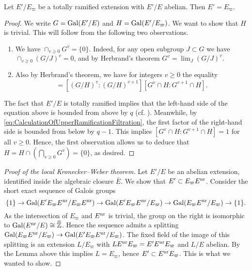 \documentclass[../main.tex]{subfiles}
\begin{document}
\begin{lem}\label{lem:LocalKronWebAlmostDone}
  Let $E'/E_\varpi$ be a totally ramified extension with $E'/E$ abelian.
  Then $E' = E_\varpi$. 
\begin{proof}
  We write $G = \operatorname{Gal}(E'/E)$ and $H = \operatorname{Gal}(E'/E_\varpi)$. We want to show that 
  $H$ is trivial. This will follow from the following two observations.
  \begin{enumerate}
    \item We have $\cap_{v \geq 0} G^v = \{0\}$. Indeed, for any open subgroup
      $J \subset G$ we have $\cap_{v \geq 0} (G/J)^v = 0$, and by Herbrand's theorem
      $G^v = \lim_J (G/J)^v$. 
    \item Also by Herbrand's theorem, we have for integers $v \geq 0$ the equality
      \begin{equation*}
        [G^v : G^{v+1}] = [(G/H)^v : (G/H)^{v+1}] [G^v \cap H : G^{v+1} \cap H].
      \end{equation*}
  \end{enumerate}
  The fact that $E'/E$ is totally ramified implies that the left-hand side of
  the equation above is bounded from above by $q$ (cf. \cite[Lemma 3]{gold1981local}).
  Meanwhile, by \eqref{eq:CalculationOfUpperRamificationFiltration}, the first factor
  of the right-hand side is bounded from below by $q-1$. This implies $[G^v \cap H :
  G^{v+1} \cap H] = 1$ for all $v \geq 0$. Hence, the first observation allows us
  to deduce that $H = H \cap \left( \bigcap_{v \geq 0} G^v \right) = \{0\}$, as desired.
\end{proof}
\end{lem}

\begin{proof}[Proof of the local Kronecker--Weber theorem]
  Let $E'/E$ be an abelian extension, identified inside the 
  algebraic closure $\bar E$. We show that $E' \subset E_\varpi E^{\mathrm{nr}}$. 
  Consider the short exact sequence of Galois groups
  \begin{equation*}
    \{1\} \to \operatorname{Gal}(E' E_\varpi E^{\mathrm{nr}}/ E_\varpi E^{\mathrm{nr}}) \to 
    \operatorname{Gal}(E' E_\varpi E^{\mathrm{nr}}/ E_\varpi) \to 
    \operatorname{Gal}(E_\varpi E^{\mathrm{nr}}/ E_\varpi) \to  \{1\}.
  \end{equation*}
  As the intersection of  $E_\varpi$ and $E^{\mathrm{nr}}$ is trivial, the group on the right
  is isomorphic to $\operatorname{Gal}(E^{\mathrm{nr}} /E) \cong \widehat {\mathbb{Z}}$. Hence the sequence admits 
  a splitting $\operatorname{Gal}(E_\varpi E^{\mathrm{nr}}/ E_\varpi) \to \operatorname{Gal}(E' E_\varpi E^{\mathrm{nr}}/
  E_\varpi)$. The fixed field of the image of this splitting is an extension
  $L/E_\varpi$ with $L E^{\mathrm{nr}} E_\varpi = E' E^{\mathrm{nr}} E_\varpi$ and $L/E$ abelian.
  By the Lemma above this implies $L = E_\varpi$, hence $E' \subset E^{\mathrm{nr}} E_\varpi$.
  This is what we wanted to show.
\end{proof}


\end{document}
